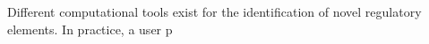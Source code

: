 Different computational tools exist for the identification of novel regulatory elements. In practice, a user p

